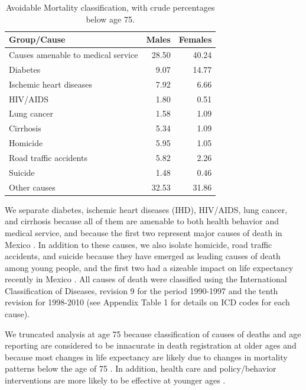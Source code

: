 \documentclass{article}
\begin{document}
\begin{table}[ht]
\centering
\caption{Avoidable Mortality classification, with crude percentages below age 75.}
\label{tab:causes}
\begin{tabular}{>{\raggedright}m{3cm}rr}
Group/Cause  & Males & Females \\ 
  \hline
Causes amenable to medical service & 28.50 & 40.24 \\ 
  Diabetes & 9.07 & 14.77 \\ 
  Ischemic heart diseases & 7.92 & 6.66 \\ 
  HIV/AIDS & 1.80 & 0.51 \\ 
  Lung cancer & 1.58 & 1.09 \\ 
  Cirrhosis & 5.34 & 1.09 \\ 
  Homicide & 5.95 & 1.05 \\ 
  Road traffic accidents & 5.82 & 2.26 \\ 
  Suicide & 1.48 & 0.46 \\ 
  Other causes & 32.53 & 31.86 \\ 
   \hline
\end{tabular}
\end{table}

We separate diabetes, ischemic heart diseases (IHD), HIV/AIDS, lung
cancer, and cirrhosis because all of them are amenable to both health behavior
and medical service, and because the first two represent major causes of death
in Mexico \citep{canudas2014}. In addition to these causes, we also isolate
homicide, road traffic accidents, and suicide because they have emerged as
leading causes of death among young people, and the first two had a sizeable
impact on life expectancy recently in Mexico \citep{canudas2014}. All causes of death were classified using the International Classification of Diseases, revision 9 for the period 1990-1997 and the tenth revision for 1998-2010 (see Appendix Table 1 for details on ICD codes for each cause).

We truncated analysis at age 75 because classification of causes of deaths and age reporting are considered to be innacurate in death registration at older ages \citep{tobias2001} and because most changes in life expectancy are likely due to changes in mortality patterns below the age of 75 \citep{Aburto2015}. In addition, health care and policy/behavior interventions are more likely to be effective at younger ages \cite{elo2014}.
\end{document}
